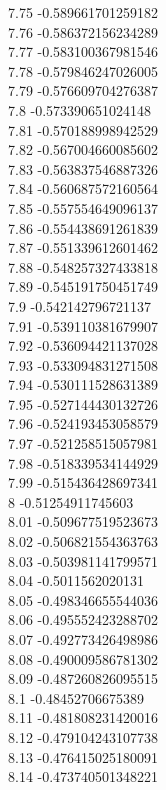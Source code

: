 {7.75	-0.589661701259182\\
7.76	-0.586372156234289\\
7.77	-0.583100367981546\\
7.78	-0.579846247026005\\
7.79	-0.576609704276387\\
7.8	-0.573390651024148\\
7.81	-0.570188998942529\\
7.82	-0.567004660085602\\
7.83	-0.563837546887326\\
7.84	-0.560687572160564\\
7.85	-0.557554649096137\\
7.86	-0.554438691261839\\
7.87	-0.551339612601462\\
7.88	-0.548257327433818\\
7.89	-0.545191750451749\\
7.9	-0.542142796721137\\
7.91	-0.539110381679907\\
7.92	-0.536094421137028\\
7.93	-0.533094831271508\\
7.94	-0.530111528631389\\
7.95	-0.527144430132726\\
7.96	-0.524193453058579\\
7.97	-0.521258515057981\\
7.98	-0.518339534144929\\
7.99	-0.515436428697341\\
8	-0.51254911745603\\
8.01	-0.509677519523673\\
8.02	-0.506821554363763\\
8.03	-0.503981141799571\\
8.04	-0.5011562020131\\
8.05	-0.498346655544036\\
8.06	-0.495552423288702\\
8.07	-0.492773426498986\\
8.08	-0.490009586781302\\
8.09	-0.487260826095515\\
8.1	-0.48452706675389\\
8.11	-0.481808231420016\\
8.12	-0.479104243107738\\
8.13	-0.476415025180091\\
8.14	-0.473740501348221\\
}
